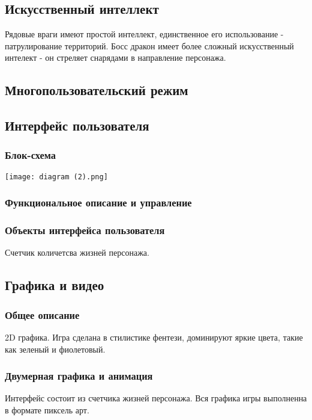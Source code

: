 \documentclass{article}
\begin{document}
\subsection{Искусственный интеллект}
Рядовые враги имеют простой интеллект, единственное его использование - патрулирование территорий. Босс дракон имеет более сложный искусственный интелект - он стреляет снарядами в направление персонажа.

\subsection{Многопользовательский режим}

\subsection{Интерфейс пользователя}
\subsubsection{Блок-схема}
        \centering
        \texttt{[image: diagram (2).png]}
        \label{fig:enter-label}
  

\subsubsection{Функциональное описание и управление}

\subsubsection{Объекты интерфейса пользователя}
Счетчик количетсва жизней персонажа.

\subsection{Графика и видео}
\subsubsection{Общее описание}
2D графика. Игра сделана в стилистике фентези, доминируют яркие цвета, такие как зеленый и фиолетовый.
\subsubsection{Двумерная графика и анимация}
Интерфейс состоит из счетчика жизней персонажа. Вся графика игры выполненна в формате пиксель арт.
\end{document}
